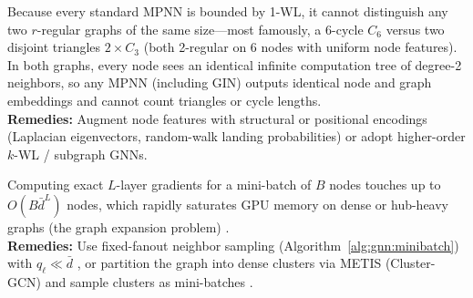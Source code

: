 \documentclass[../../../../master.tex]{subfiles}
\begin{document}
\begin{pitfall}
\label{pit:gnn:wl_ceiling}
Because every standard MPNN is bounded by 1-WL, it cannot distinguish any two $r$-regular graphs of the same size---most famously, a 6-cycle $C_6$ versus two disjoint triangles $2 \times C_3$ (both 2-regular on 6 nodes with uniform node features). In both graphs, every node sees an identical infinite computation tree of degree-2 neighbors, so any MPNN (including GIN) outputs identical node and graph embeddings and cannot count triangles or cycle lengths.\\
\textbf{Remedies:} Augment node features with structural or positional encodings (Laplacian eigenvectors, random-walk landing probabilities) or adopt higher-order $k$-WL / subgraph GNNs.
\end{pitfall}

\begin{pitfall}
\label{pit:gnn:neighbor_explosion}
Computing exact $L$-layer gradients for a mini-batch of $B$ nodes touches up to $O(B \bar{d}^L)$ nodes, which rapidly saturates GPU memory on dense or hub-heavy graphs (the graph expansion problem) .\\
\textbf{Remedies:} Use fixed-fanout neighbor sampling (Algorithm~\ref{alg:gnn:minibatch}) with $q_\ell \ll \bar{d}$ , or partition the graph into dense clusters via METIS (Cluster-GCN) and sample clusters as mini-batches .
\end{pitfall}
\end{document}
